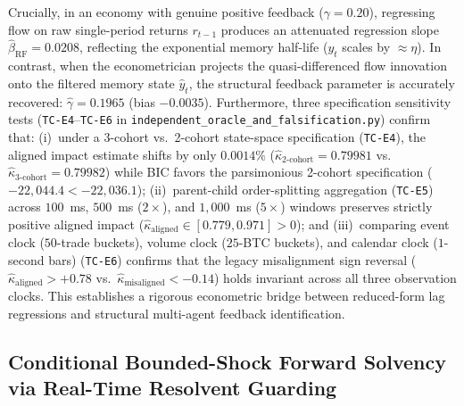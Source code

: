 \documentclass[12pt]{article}
\theoremstyle{definition}
\theoremstyle{remark}
\begin{document}
Crucially, in an economy with genuine positive feedback ($\gamma = 0.20$), regressing flow on raw single-period returns $r_{t-1}$ produces an attenuated regression slope $\hat{\beta}_{\mathrm{RF}} = 0.0208$, reflecting the exponential memory half-life ($y_t$ scales by $\approx \eta$). In contrast, when the econometrician projects the quasi-differenced flow innovation onto the filtered memory state $\hat{y}_t$, the structural feedback parameter is accurately recovered: $\hat{\gamma} = 0.1965$ (bias $-0.0035$). Furthermore, three specification sensitivity tests (\texttt{TC-E4}--\texttt{TC-E6} in \nolinkurl{independent_oracle_and_falsification.py}) confirm that: (i)~under a 3-cohort vs.\ 2-cohort state-space specification (\texttt{TC-E4}), the aligned impact estimate shifts by only $0.0014\%$ ($\hat{\kappa}_{2\text{-cohort}} = 0.79981$ vs.\ $\hat{\kappa}_{3\text{-cohort}} = 0.79982$) while BIC favors the parsimonious 2-cohort specification ($-22{,}044.4 < -22{,}036.1$); (ii)~parent-child order-splitting aggregation (\texttt{TC-E5}) across $100$~ms, $500$~ms ($2\times$), and $1{,}000$~ms ($5\times$) windows preserves strictly positive aligned impact ($\hat{\kappa}_{\mathrm{aligned}} \in [0.779, 0.971] > 0$); and (iii)~comparing event clock ($50$-trade buckets), volume clock ($25$-BTC buckets), and calendar clock ($1$-second bars) (\texttt{TC-E6}) confirms that the legacy misalignment sign reversal ($\hat{\kappa}_{\mathrm{aligned}} > +0.78$ vs.\ $\hat{\kappa}_{\mathrm{misaligned}} < -0.14$) holds invariant across all three observation clocks. This establishes a rigorous econometric bridge between reduced-form lag regressions and structural multi-agent feedback identification.

\subsection{Conditional Bounded-Shock Forward Solvency via Real-Time Resolvent Guarding}
\label{ia:crash_free_guard}
\end{document}
